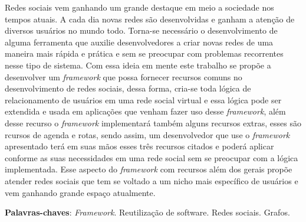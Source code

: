 \begin{resumo}

Redes sociais vem ganhando um grande destaque em meio a sociedade nos tempos atuais. A cada dia novas redes são desenvolvidas e ganham a atenção de diversos usuários no mundo todo. Torna-se necessário o desenvolvimento de alguma ferramenta que auxilie desenvolvedores a criar novas redes de uma maneira mais rápida e prática e sem se preocupar com problemas recorrentes nesse tipo de sistema. Com essa ideia em mente este trabalho se propõe a desenvolver um \textit{framework} que possa fornecer recursos comuns no desenvolvimento de redes sociais, dessa forma, cria-se toda lógica de relacionamento de usuários em uma rede social virtual e essa lógica pode ser extendida e usada em aplicações que venham fazer uso desse \textit{framework}, além desse recurso o \textit{framework} implementará também alguns recursos extras, esses são rcursos de agenda e rotas, sendo assim, um desenvolvedor que use o \textit{framework} apresentado terá em suas mãos esses três recursos citados e poderá aplicar conforme as suas necessidades em uma rede social sem se preocupar com a lógica implementada. Esse aspecto do \textit{framework} com recursos além dos gerais propõe atender redes sociais que tem se voltado a um nicho mais específico de usuários e vem ganhando grande espaço atualmente.

 \vspace{\onelineskip}
    
 \noindent
 \textbf{Palavras-chaves}: \textit{Framework}. Reutilização de software. Redes sociais. Grafos.
\end{resumo}
